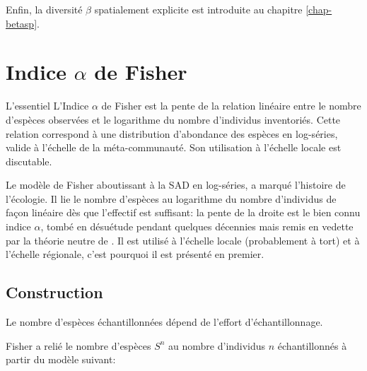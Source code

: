\documentclass[
  11pt,
  french,
  a4paper,
  extrafontsizes,onecolumn,openright
  ]{memoir}
\newenvironment{Summary}
  {\begin{bclogo}[logo=\bctrombone, noborder=true, couleur=lightgray!50]{L'essentiel}\parindent0pt}
  {\end{bclogo}}
\begin{document}
Enfin, la diversité \(\beta\) spatialement explicite est introduite au chapitre \ref{chap-betasp}.

\hypertarget{chap-Fisher}{%
\chapter{\texorpdfstring{Indice \(\alpha\) de Fisher}{Indice \textbackslash alpha de Fisher}}\label{chap-Fisher}}

\scriptsize

\begin{Summary}
L'Indice \(\alpha\) de Fisher est la pente de la relation linéaire entre
le nombre d'espèces observées et le logarithme du nombre d'individus
inventoriés. Cette relation correspond à une distribution d'abondance
des espèces en log-séries, valide à l'échelle de la méta-communauté. Son
utilisation à l'échelle locale est discutable.
\end{Summary}

\normalsize

Le modèle de Fisher \autocite{Fisher1943} aboutissant à la SAD en log-séries, a marqué l'histoire de l'écologie.
Il lie le nombre d'espèces au logarithme du nombre d'individus de façon linéaire dès que l'effectif est suffisant: la pente de la droite est le bien connu indice \(\alpha\), tombé en désuétude pendant quelques décennies mais remis en vedette par la théorie neutre de \textcite{Hubbell2001}.
Il est utilisé à l'échelle locale (probablement à tort) et à l'échelle régionale, c'est pourquoi il est présenté en premier.

\hypertarget{construction}{%
\section{Construction}\label{construction}}

Le nombre d'espèces échantillonnées dépend de l'effort d'échantillonnage.

Fisher a relié le nombre d'espèces \(S^{n}\) au nombre d'individus \(n\) échantillonnés à partir du modèle suivant:
\end{document}
